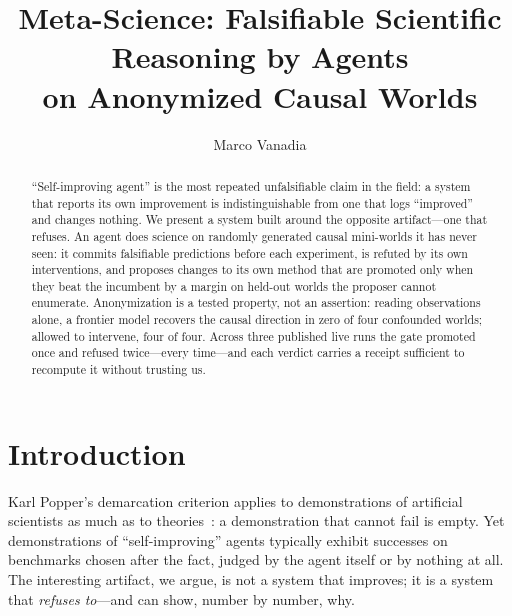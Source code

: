 \documentclass{llncs}
\begin{document}
\title{Meta-Science: Falsifiable Scientific Reasoning by Agents\\
on Anonymized Causal Worlds}

\author{Marco Vanadia}

\maketitle

\begin{abstract}
``Self-improving agent'' is the most repeated unfalsifiable claim in the
field: a system that reports its own improvement is indistinguishable from one
that logs ``improved'' and changes nothing. We present a system built around
the opposite artifact---one that refuses. An agent does science on randomly
generated causal mini-worlds it has never seen: it commits falsifiable
predictions before each experiment, is refuted by its own interventions, and
proposes changes to its own method that are promoted only when they beat the
incumbent by a margin on held-out worlds the proposer cannot enumerate.
Anonymization is a tested property, not an assertion: reading observations
alone, a frontier model recovers the causal direction in zero of four
confounded worlds; allowed to intervene, four of four. Across three published
live runs the gate promoted once and refused twice---every time---and each
verdict carries a receipt sufficient to recompute it without trusting us.
\end{abstract}


\section{Introduction}

Karl Popper's demarcation criterion applies to demonstrations of artificial
scientists as much as to theories~\cite{popper}: a demonstration that cannot
fail is empty. Yet demonstrations of ``self-improving'' agents typically
exhibit successes on benchmarks chosen after the fact, judged by the agent
itself or by nothing at all. The interesting artifact, we argue, is not a
system that improves; it is a system that \emph{refuses to}---and can show,
number by number, why.
\end{document}
